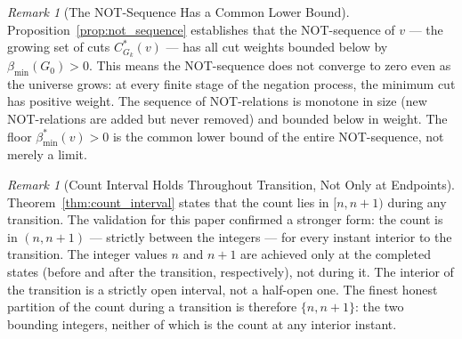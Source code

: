 \documentclass[11pt,twocolumn,a4paper]{article}
\theoremstyle{plain}
\theoremstyle{definition}
\theoremstyle{remark}
\newtheorem{remark}[theorem]{Remark}
\newcommand{\bmin}{\beta_{\min}}
\begin{document}
\begin{remark}[The NOT-Sequence Has a Common Lower Bound]
\label{rem:not_floor}
Proposition~\ref{prop:not_sequence} establishes that the NOT-sequence of
$v$ --- the growing set of cuts $C^*_{G_k}(v)$ --- has all cut weights
bounded below by $\bmin(G_0) > 0$. This means the NOT-sequence does not
converge to zero even as the universe grows: at every finite stage of the
negation process, the minimum cut has positive weight. The sequence of
NOT-relations is monotone in size (new NOT-relations are added but never
removed) and bounded below in weight. The floor $\bmin^*(v) > 0$ is the
common lower bound of the entire NOT-sequence, not merely a limit.
\end{remark}

\begin{remark}[Count Interval Holds Throughout Transition, Not Only at Endpoints]
\label{rem:count_interior}
Theorem~\ref{thm:count_interval} states that the count lies in $[n, n+1)$
during any transition. The validation for this paper confirmed a stronger
form: the count is in $(n, n+1)$ --- strictly between the integers --- for
every instant interior to the transition. The integer values $n$ and $n+1$
are achieved only at the completed states (before and after the transition,
respectively), not during it. The interior of the transition is a strictly
open interval, not a half-open one. The finest honest partition of the count
during a transition is therefore $\{n, n+1\}$: the two bounding integers,
neither of which is the count at any interior instant.
\end{remark}
\end{document}
